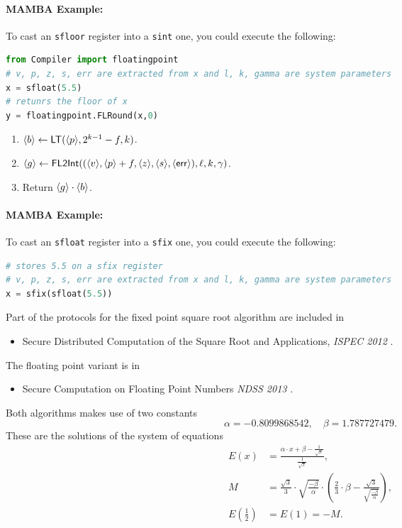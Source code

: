 \paragraph{MAMBA Example:} To cast an \verb|sfloor| register into a \verb|sint| one, you could execute the following: 
\begin{lstlisting}[language={python}]
from Compiler import floatingpoint
# v, p, z, s, err are extracted from x and l, k, gamma are system parameters 
x = sfloat(5.5)
# retunrs the floor of x
y = floatingpoint.FLRound(x,0)
\end{lstlisting}
\begin{enumerate}
\item $\langle b \rangle \leftarrow \mathsf{LT}(\langle p \rangle,2^{k-1}-f,k)$.
\item $\langle g \rangle \leftarrow \mathsf{FL2Int}((\langle v \rangle,\langle p \rangle+f,\langle z \rangle,
	\langle s \rangle,\langle \mathsf{err} \rangle),\ell,k,\gamma)$.
\item Return $\langle g \rangle \cdot \langle b \rangle$.
\end{enumerate}
\paragraph{MAMBA Example:} To cast an \verb|sfloat| register into a \verb|sfix| one, you could execute the following: 
\begin{lstlisting}[language={python}]
# stores 5.5 on a sfix register
# v, p, z, s, err are extracted from x and l, k, gamma are system parameters 
x = sfix(sfloat(5.5))
\end{lstlisting}

Part of the protocols for the fixed point square root algorithm are included in
\begin{itemize}
\item Secure Distributed Computation of the Square Root and Applications, {\em ISPEC 2012}
\cite{Liedel12}.
\end{itemize}
The floating point variant is in
\begin{itemize}
\item Secure Computation on Floating Point Numbers {\em NDSS 2013} \cite{ABZS13}.
\end{itemize}
Both algorithms makes use of two constants
\[ \alpha = -0.8099868542, \quad \beta  =  1.787727479.  \]
These are the solutions of the system of equations
\begin{align*}
   E(x)&= \frac{\alpha \cdot x+\beta-\frac{1}{\sqrt{x}}}{\frac{1}{\sqrt{x}}}, \\
	M &= \frac{\sqrt{3}}{3} \cdot \sqrt{\frac{-\beta}{\alpha}}
	    \cdot \left(\frac{2}{3} \cdot\beta
		    -\frac{\sqrt{3}}{\sqrt{\frac{-\beta}{\alpha}}} 
	    \right), \\
   E\left( \frac{1}{2}\right) &= E(1) = -M.
\end{align*}

